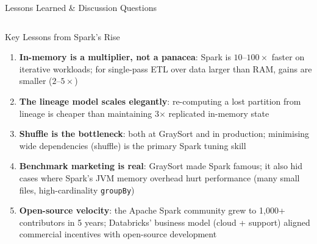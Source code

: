 \documentclass[aspectratio=169,10pt]{beamer}
\begin{document}
\begin{frame}{Lessons Learned \& Discussion Questions}
  \begin{columns}[T]
      \begin{block}{Key Lessons from Spark's Rise}
        \begin{enumerate}
          \item \textbf{In-memory is a multiplier, not a panacea}:
                Spark is $10\text{--}100\times$ faster on iterative
                workloads; for single-pass ETL over data larger than
                RAM, gains are smaller ($2\text{--}5\times$)
          \item \textbf{The lineage model scales elegantly}:
                re-computing a lost partition from lineage is cheaper
                than maintaining 3$\times$ replicated in-memory state
          \item \textbf{Shuffle is the bottleneck}:
                both at GraySort and in production; minimising wide
                dependencies (shuffle) is the primary Spark tuning skill
          \item \textbf{Benchmark marketing is real}:
                GraySort made Spark famous; it also hid cases where
                Spark's JVM memory overhead hurt performance
                (many small files, high-cardinality \texttt{groupBy})
          \item \textbf{Open-source velocity}: the Apache Spark community
                grew to 1{,}000+ contributors in 5 years;
                Databricks' business model (cloud + support) aligned
                commercial incentives with open-source development
        \end{enumerate}
      \end{block}


\end{columns}
\end{frame}
\end{document}
